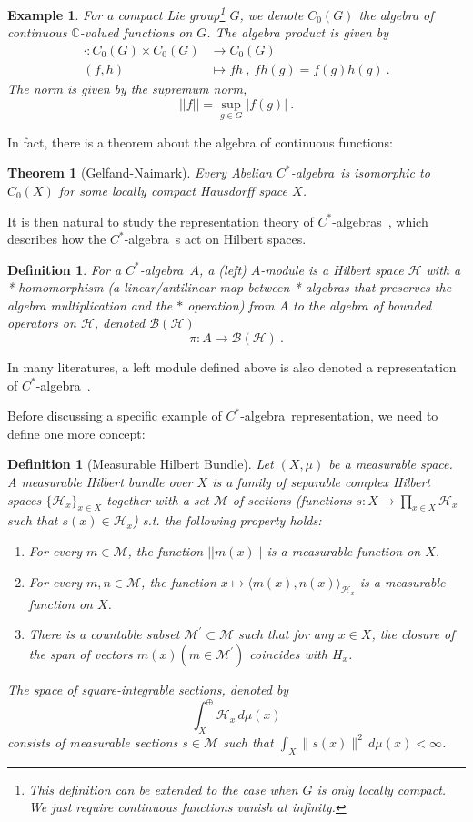 \documentclass[a4paper,11pt]{article}
\newtheorem{theorem}[lemma]{Theorem}
\newtheorem{defn}[lemma]{Definition}
\newtheorem{exm}[lemma]{Example}
\newcommand{\Ch}{\mathrm{Ch}}
\newcommand{\CH}{\Ch_{\mu_1\mu_2}(Q_F,{t},{q})}
\newcommand{\be}{\begin{equation}}
\newcommand{\ee}{\end{equation}}
\newcommand{\ba}{\begin{aligned}}
\newcommand{\ea}{\end{aligned}}
\def\bbC{\mathbb{C}}
\def\CH{\mathcal{H}}
\def\CM{\mathcal{M}}
\def\calg{$C^*$-algebra\ }
\def\calgs{$C^*$-algebras\ }
\begin{document}
\begin{exm}
    For a compact Lie group\footnote{This definition can be extended to the case when $G$ is only locally compact. We just require continuous functions vanish at infinity.} $G$, we denote $C_0(G)$ the algebra of continuous $\bbC$-valued functions on $G$. The algebra product is given by
    \be\ba \cdot: C_0(G)\times C_0(G) &\to C_0(G) \\ (f,h)&\mapsto fh  \ , \  
    fh(g) = f(g)h(g) \ .\ea\ee
    The norm is given by the supremum norm,
    \be ||f|| =  \sup_{g\in G} |f(g)| \ . \ee
\end{exm}
In fact, there is a theorem about the algebra of continuous functions:
\begin{theorem}[Gelfand-Naimark]\label{thm:GelfandNaimark}
    Every Abelian \calg is isomorphic to $C_0(X)$ for some locally compact Hausdorff space $X$.
\end{theorem}
It is then natural to study the representation theory of \calgs, which describes how the \calg s act on Hilbert spaces.
\begin{defn}
    For a \calg $A$, a {\rm (left) $A$-module} is a Hilbert space $\CH$ with a *-homomorphism (a linear/antilinear map between *-algebras that preserves the algebra multiplication and the $*$ operation) from $A$ to the algebra of bounded operators on $\CH$, denoted $\mathscr{B}(\CH)$
    \be  \pi: A \to \mathscr{B}(\CH) \ . \ee
\end{defn}
In many literatures, a left module defined above is also denoted a representation of \calg.

Before discussing a specific example of \calg representation, we need to define one more concept:
\begin{defn}[Measurable Hilbert Bundle]
Let $(X, \mu)$ be a measurable space. A {\rm measurable Hilbert bundle} over $X$ is a family of separable complex Hilbert spaces $\{\mathcal{H}_x\}_{x \in X}$ together with a set $\mathcal{M}$ of sections (functions $s: X \to \prod_{x \in X} \mathcal{H}_x$ such that $s(x) \in \mathcal{H}_x$) s.t. the following property holds:
\begin{enumerate}
    \item For every $m\in \CM$, the function $||m(x)||$ is a measurable function on $X$.
    \item For every $m,n \in \mathcal{M}$, the function $x \mapsto \langle m(x), n(x) \rangle_{\mathcal{H}_x}$
    is a measurable function on $X$.
    \item There is a countable subset $\CM^{\prime} \subset \CM$ such that for any $x \in X$, the closure of the span of vectors $m(x)\left(m \in \CM^{\prime}\right)$ coincides with $H_x$.
\end{enumerate}
The space of square-integrable sections, denoted by
\be \int_X^\oplus \mathcal{H}_x \, d\mu(x) \ee
consists of measurable sections $s \in \mathcal{M}$ such that $\int_X \|s(x)\|^2 \, d\mu(x) < \infty$.
\end{defn}
\end{document}
